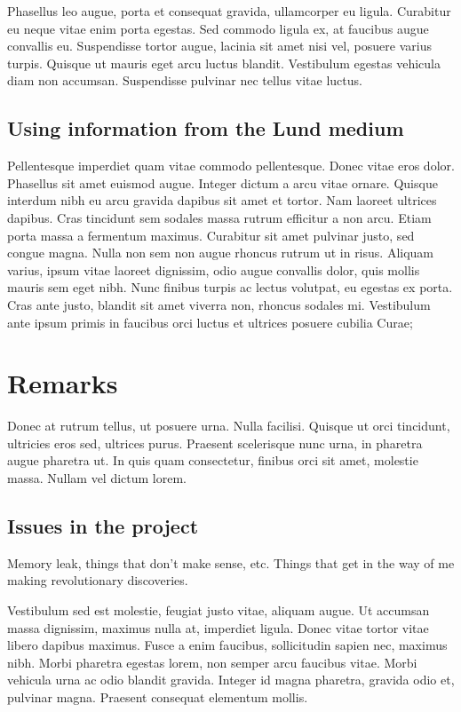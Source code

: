 \documentclass[parskip=full]{scrreprt}
\begin{document}
Phasellus leo augue, porta et consequat gravida, ullamcorper eu ligula. Curabitur eu neque vitae enim porta egestas. Sed commodo ligula ex, at faucibus augue convallis eu. Suspendisse tortor augue, lacinia sit amet nisi vel, posuere varius turpis. Quisque ut mauris eget arcu luctus blandit. Vestibulum egestas vehicula diam non accumsan. Suspendisse pulvinar nec tellus vitae luctus.

\section{Using information from the Lund medium}
\label{sec:lund}

Pellentesque imperdiet quam vitae commodo pellentesque. Donec vitae eros dolor. Phasellus sit amet euismod augue. Integer dictum a arcu vitae ornare. Quisque interdum nibh eu arcu gravida dapibus sit amet et tortor. Nam laoreet ultrices dapibus. Cras tincidunt sem sodales massa rutrum efficitur a non arcu. Etiam porta massa a fermentum maximus. Curabitur sit amet pulvinar justo, sed congue magna. Nulla non sem non augue rhoncus rutrum ut in risus. Aliquam varius, ipsum vitae laoreet dignissim, odio augue convallis dolor, quis mollis mauris sem eget nibh. Nunc finibus turpis ac lectus volutpat, eu egestas ex porta. Cras ante justo, blandit sit amet viverra non, rhoncus sodales mi. Vestibulum ante ipsum primis in faucibus orci luctus et ultrices posuere cubilia Curae;

\chapter{Remarks}
\label{ch:remarks}

Donec at rutrum tellus, ut posuere urna. Nulla facilisi. Quisque ut orci tincidunt, ultricies eros sed, ultrices purus. Praesent scelerisque nunc urna, in pharetra augue pharetra ut. In quis quam consectetur, finibus orci sit amet, molestie massa. Nullam vel dictum lorem. 

\section{Issues in the project}
\label{sec:issues}

Memory leak, things that don't make sense, etc. Things that get in the way of me making revolutionary discoveries.

Vestibulum sed est molestie, feugiat justo vitae, aliquam augue. Ut accumsan massa dignissim, maximus nulla at, imperdiet ligula. Donec vitae tortor vitae libero dapibus maximus. Fusce a enim faucibus, sollicitudin sapien nec, maximus nibh. Morbi pharetra egestas lorem, non semper arcu faucibus vitae. Morbi vehicula urna ac odio blandit gravida. Integer id magna pharetra, gravida odio et, pulvinar magna. Praesent consequat elementum mollis.
\end{document}
